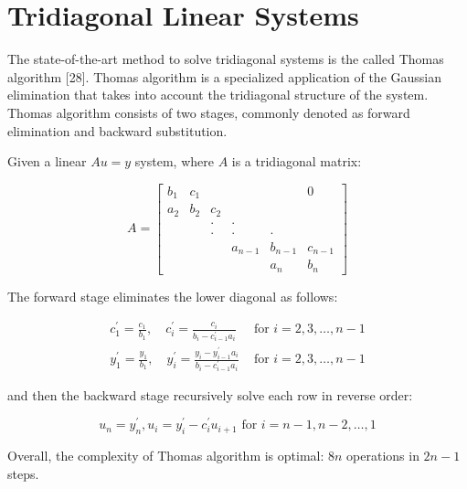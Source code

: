 \vspace{10ex}
\section{Tridiagonal Linear Systems}
The state-of-the-art method to solve tridiagonal systems is the called Thomas algorithm [28]. Thomas algorithm is a specialized application of the Gaussian elimination
that takes into account the tridiagonal structure of the system. Thomas algorithm
consists of two stages, commonly denoted as forward elimination and backward substitution.

Given a linear $Au = y$ system, where $A$ is a tridiagonal matrix:

\begin{equation}
    A=\left[\begin{array}{cccccc}
        b_{1} & c_{1} & & & & 0 \\
        a_{2} & b_{2} & c_{2} & & & \\
        & & \cdot & \cdot & & \\
        & & \cdot & \cdot & \cdot & \\
        & & & a_{n-1} & b_{n-1} & c_{n-1} \\
        & & & & a_{n} & b_{n}
        \end{array}\right]
\end{equation}

The forward stage eliminates the lower diagonal as follows:

\begin{equation}
    \begin{aligned}
        c_{1}^{\prime}=\frac{c_{1}}{b_{1}}, \quad c_{i}^{\prime}=\frac{c_{i}}{b_{i}-c_{i-1}^{\prime} a_{i}} & \text { for } i=2,3, \ldots, n-1 \\
        y_{1}^{\prime}=\frac{y_{1}}{b_{1}}, \quad y_{i}^{\prime}=\frac{y_{i}-y_{i-1}^{\prime} a_{i}}{b_{i}-c_{i-1}^{\prime} a_{i}} & \text { for } i=2,3, \ldots, n-1
    \end{aligned}
\end{equation}

and then the backward stage recursively solve each row in reverse order:

\begin{equation}
    u_{n}=y_{n}^{\prime}, u_{i}=y_{i}^{\prime}-c_{i}^{\prime} u_{i+1} \text { for } i=n-1, n-2, \ldots, 1
\end{equation}

Overall, the complexity of Thomas algorithm is optimal: $8n$ operations 
in $2n - 1$ steps.

